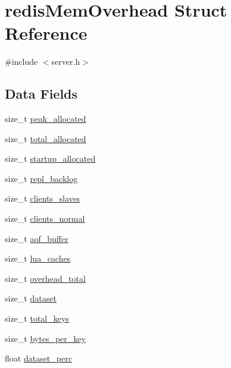 \hypertarget{structredis_mem_overhead}{}\section{redis\+Mem\+Overhead Struct Reference}
\label{structredis_mem_overhead}


{\ttfamily \#include $<$server.\+h$>$}

\subsection*{Data Fields}
\begin{DoxyCompactItemize}
\item 
size\+\_\+t \hyperlink{structredis_mem_overhead_a52004d56324eaeaabb6686b05052ca55}{peak\+\_\+allocated}
\item 
size\+\_\+t \hyperlink{structredis_mem_overhead_a3bb14855f7c280e92d0c01bbbc9b4c3c}{total\+\_\+allocated}
\item 
size\+\_\+t \hyperlink{structredis_mem_overhead_a0e982a0e14543ef6e17073a6d4afe191}{startup\+\_\+allocated}
\item 
size\+\_\+t \hyperlink{structredis_mem_overhead_a4377a6a963ee32e22c7c7f14180a4a31}{repl\+\_\+backlog}
\item 
size\+\_\+t \hyperlink{structredis_mem_overhead_ace2b062189925c36433d3a8e68062d6e}{clients\+\_\+slaves}
\item 
size\+\_\+t \hyperlink{structredis_mem_overhead_af21382aaf8f931d992586bbfe5f8aca2}{clients\+\_\+normal}
\item 
size\+\_\+t \hyperlink{structredis_mem_overhead_ad441a7ae10a5fee32c6d0b0dbfc92791}{aof\+\_\+buffer}
\item 
size\+\_\+t \hyperlink{structredis_mem_overhead_aede1fc4f53c4e19111df241fe70fb77c}{lua\+\_\+caches}
\item 
size\+\_\+t \hyperlink{structredis_mem_overhead_a2a959b51b26f4ced3ab179af23f19fba}{overhead\+\_\+total}
\item 
size\+\_\+t \hyperlink{structredis_mem_overhead_a8747868103d88dad18f00837aaeca24a}{dataset}
\item 
size\+\_\+t \hyperlink{structredis_mem_overhead_ab0dd532666871698a3e8dc420ec74b28}{total\+\_\+keys}
\item 
size\+\_\+t \hyperlink{structredis_mem_overhead_aa8888087ab630e5da0b3a0e179298d86}{bytes\+\_\+per\+\_\+key}
\item 
float \hyperlink{structredis_mem_overhead_ad413cc014759c00757b5fda0d4c94c2e}{dataset\+\_\+perc}

\end{DoxyCompactItemize}
